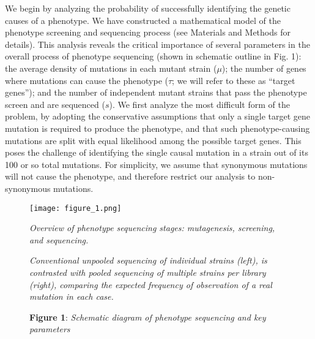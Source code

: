 \documentclass[letterpaper,10pt,english]{howto}
\begin{document}
We begin by analyzing the probability of successfully identifying
the genetic causes of a phenotype.  We have constructed a mathematical
model of the phenotype screening and sequencing process (see Materials
and Methods for details).  This analysis reveals the critical
importance of several parameters in the overall process
of phenotype sequencing (shown in schematic outline in Fig. 1):
the average density of mutations in each mutant strain ($\mu$);
the number of genes where mutations can cause the phenotype
($\tau$; we will refer to these as ``target genes'');
and the number of independent mutant strains that pass the
phenotype screen and are sequenced ($s$).  We first
analyze the most difficult form of the problem, by adopting
the conservative assumptions that only a single target gene
mutation is required to produce the phenotype, and that such
phenotype-causing mutations are split with equal likelihood
among the possible target genes.  This poses the challenge of identifying
the single causal mutation in a strain out of its 100 or so
total mutations.  For simplicity, we assume that synonymous
mutations will not cause the phenotype, and therefore restrict our analysis
to non-synonymous mutations.
\hypertarget{processfig}{}\begin{figure}[htbp]
\centering

\texttt{[image: figure\_1.png]}
\caption{\textbf{Figure 1}: \emph{Schematic diagram of phenotype sequencing and key parameters}}{\small 
\emph{Overview of phenotype sequencing stages: mutagenesis,
screening, and sequencing.}

\emph{Conventional unpooled sequencing of individual
strains (left), is contrasted with pooled sequencing of multiple strains
per library (right), comparing the expected frequency of
observation of a real mutation in each case.}
}\end{figure}
\end{document}
